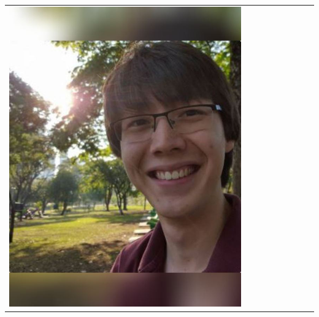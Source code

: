 \documentclass[landscape,a0paper,fontscale=0.292]{baposter}
\begin{document}
\begin{poster}
{\begin{center}
\begin{tabularx}{\linewidth}{X X X X X X X X X}
{\centering \includegraphics[width=0.65\linewidth]{franzoni.jpg}}\\ 


\end{tabularx}
\end{center}}
\end{poster}
\end{document}

